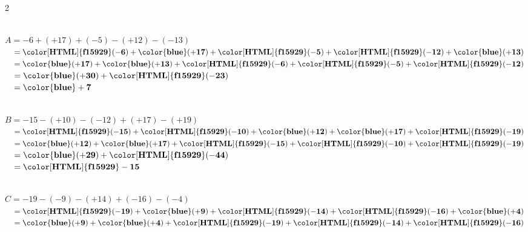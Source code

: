 \begin{corrige}
    \phantom{rrr}    
    \begin{multicols}2
        \begin{list}{}
            \item \phantom{rrr}\\
            $ A =  -6+(+17)+(-5)-(+12)-(-13)$\\
            $ \phantom{A}= \mathbf{{\color[HTML]{f15929}(-6)}}+\mathbf{{\color{blue}(+17)}}+\mathbf{{\color[HTML]{f15929}(-5)}}+\mathbf{{\color[HTML]{f15929}(-12)}}+\mathbf{{\color{blue}(+13)}} $\\
            $ \phantom{A}= \mathbf{{\color{blue}(+17)}}+\mathbf{{\color{blue}(+13)}}+\mathbf{{\color[HTML]{f15929}(-6)}}+\mathbf{{\color[HTML]{f15929}(-5)}}+\mathbf{{\color[HTML]{f15929}(-12)}} $\\
            $ \phantom{A}= \mathbf{{\color{blue}(+30)}}+\mathbf{{\color[HTML]{f15929}(-23)}} $\\
            $ \phantom{A}= \mathbf{{\color{blue}+7}} $\\
            \item \phantom{rrr}\\
            $ B =  -15-(+10)-(-12)+(+17)-(+19)$\\
            $ \phantom{A}= \mathbf{{\color[HTML]{f15929}(-15)}}+\mathbf{{\color[HTML]{f15929}(-10)}}+\mathbf{{\color{blue}(+12)}}+\mathbf{{\color{blue}(+17)}}+\mathbf{{\color[HTML]{f15929}(-19)}} $\\
            $ \phantom{A}= \mathbf{{\color{blue}(+12)}}+\mathbf{{\color{blue}(+17)}}+\mathbf{{\color[HTML]{f15929}(-15)}}+\mathbf{{\color[HTML]{f15929}(-10)}}+\mathbf{{\color[HTML]{f15929}(-19)}} $\\
            $ \phantom{A}= \mathbf{{\color{blue}(+29)}}+\mathbf{{\color[HTML]{f15929}(-44)}} $\\
            $ \phantom{A}= \mathbf{{\color[HTML]{f15929}-15}} $\\
            \item \phantom{rrr}\\
            $ C =  -19-(-9)-(+14)+(-16)-(-4)$\\
            $ \phantom{A}= \mathbf{{\color[HTML]{f15929}(-19)}}+\mathbf{{\color{blue}(+9)}}+\mathbf{{\color[HTML]{f15929}(-14)}}+\mathbf{{\color[HTML]{f15929}(-16)}}+\mathbf{{\color{blue}(+4)}} $\\
            $ \phantom{A}= \mathbf{{\color{blue}(+9)}}+\mathbf{{\color{blue}(+4)}}+\mathbf{{\color[HTML]{f15929}(-19)}}+\mathbf{{\color[HTML]{f15929}(-14)}}+\mathbf{{\color[HTML]{f15929}(-16)}} $\\

\end{list}
\end{multicols}
\end{corrige}
